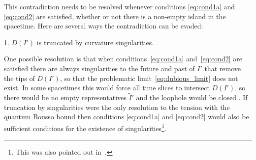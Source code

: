 \documentclass[a4paper,11pt]{article}
\begin{document}
This contradiction needs to be resolved whenever conditions \eqref{eq:cond1a} and \eqref{eq:cond2} are satisfied, whether or not there is a non-empty island in the spacetime. Here are several ways the contradiction can be evaded:

\vspace{3mm}
1. $D(I')$ is truncated by curvature singularities.
\vspace{3mm}

One possible resolution is that when conditions~\eqref{eq:cond1a} and~\eqref{eq:cond2} are satisfied there are always singularities to the future and past of $I'$ that remove the tips of $D(I')$, so that the problematic limit~\eqref{eq:dubious_limit} does not exist. In some spacetimes this would force all time slices to intersect $D(I')$, so there would be no empty representatives $\tilde{I}'$ and the loophole would be closed
. If truncation by singularities were the only resolution to the tension with the quantum Bousso bound then conditions \eqref{eq:cond1a} and \eqref{eq:cond2} would also be sufficient conditions for the existence of singularities\footnote{This was also pointed out in~\cite{BoussoTalk}.}.


\end{document}
